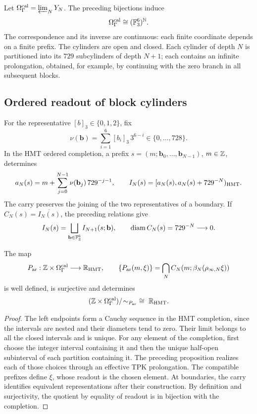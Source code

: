 Let \(\Omega_{\Gamma}^{\rm cal}=\varprojlim_NY_N\). The preceding bijections induce
\[
 \Omega_{\Gamma}^{\rm cal}\cong(\mathbb F_3^6)^{\mathbb N}.
\]
The correspondence and its inverse are continuous: each finite coordinate depends on a finite prefix. The cylinders are open and closed. Each cylinder of depth \(N\) is partitioned into its \(729\) subcylinders of depth \(N+1\); each contains an infinite prolongation, obtained, for example, by continuing with the zero branch in all subsequent blocks.



\subsection{Ordered readout of block cylinders}
\label{hmtfg:publicacion-cilindros-bloque}

For the representative \([b]_3\in\{0,1,2\}\), fix
\[
 \nu(\mathbf b)=\sum_{i=1}^6[b_i]_3\,3^{6-i}\in\{0,\ldots,728\}.
\]
In the HMT ordered completion, a prefix
\(s=(m;\mathbf b_0,\ldots,\mathbf b_{N-1})\), \(m\in\mathbb Z\), determines
\[
 a_N(s)=m+\sum_{j=0}^{N-1}\nu(\mathbf b_j)\,729^{-j-1},\qquad
 I_N(s)=[a_N(s),a_N(s)+729^{-N})_{\rm HMT}.
\]
The carry preserves the joining of the two representatives of a boundary. If \(C_N(s)=\overline{I_N(s)}\), the preceding relations give
\[
 I_N(s)=\bigsqcup_{\mathbf b\in\mathbb F_3^6}I_{N+1}(s;\mathbf b),
 \qquad \operatorname{diam}C_N(s)=729^{-N}\longrightarrow0.
\]

\begin{proposition}
\label{hmtfg:cobertura-arquimediana}
The map
\[
 P_{\rm ar}:\mathbb Z\times\Omega_\Gamma^{\rm cal}
       \longrightarrow\mathbb R_{\rm HMT},\qquad
 \{P_{\rm ar}(m,\xi)\}
    =\bigcap_N C_N(m;\beta_N(\rho_{\infty,N}\xi))
\]
is well defined, is surjective and determines
\[
 (\mathbb Z\times\Omega_\Gamma^{\rm cal})/\!\sim_{P_{\rm ar}}
       \ \cong\ \mathbb R_{\rm HMT}.
\]
\end{proposition}
\begin{proof}
The left endpoints form a Cauchy sequence in the HMT completion, since the intervals are nested and their diameters tend to zero. Their limit belongs to all the closed intervals and is unique. For any element of the completion, first choose the integer interval containing it and then the unique half-open subinterval of each partition containing it. The preceding proposition realizes each of those choices through an effective TPK prolongation. The compatible prefixes define \(\xi\), whose readout is the chosen element. At boundaries, the carry identifies equivalent representations after their construction. By definition and surjectivity, the quotient by equality of readout is in bijection with the completion.
\end{proof}

